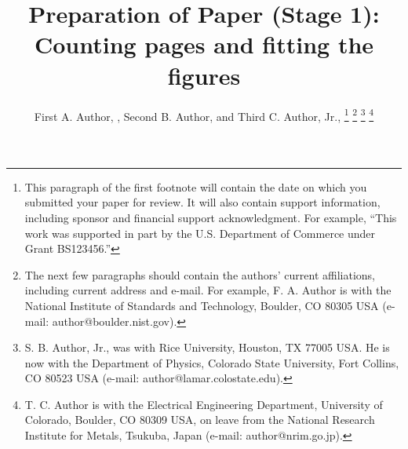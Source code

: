 \documentclass[journal,twoside,web]{ieeecolor2}
\begin{document}
\title{Preparation of Paper (Stage 1): Counting pages and fitting the figures}
\author{First A. Author, , Second B. Author, and Third C. Author, Jr., 
\thanks{This paragraph of the first footnote will contain the date on 
which you submitted your paper for review. It will also contain support 
information, including sponsor and financial support acknowledgment. For 
example, ``This work was supported in part by the U.S. Department of 
Commerce under Grant BS123456.'' }
\thanks{The next few paragraphs should contain 
the authors' current affiliations, including current address and e-mail. For 
example, F. A. Author is with the National Institute of Standards and 
Technology, Boulder, CO 80305 USA (e-mail: author@boulder.nist.gov). }
\thanks{S. B. Author, Jr., was with Rice University, Houston, TX 77005 USA. He is 
now with the Department of Physics, Colorado State University, Fort Collins, 
CO 80523 USA (e-mail: author@lamar.colostate.edu).}
\thanks{T. C. Author is with 
the Electrical Engineering Department, University of Colorado, Boulder, CO 
80309 USA, on leave from the National Research Institute for Metals, 
Tsukuba, Japan (e-mail: author@nrim.go.jp).}}

\maketitle
\end{document}
